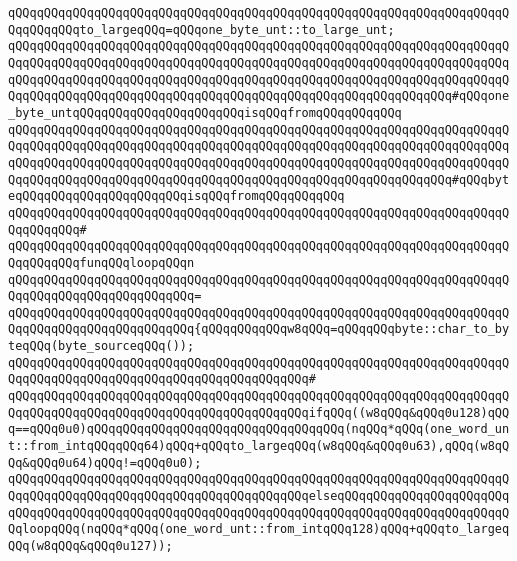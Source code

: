 \newline
\verb|qQQqqQQqqQQqqQQqqQQqqQQqqQQqqQQqqQQqqQQqqQQqqQQqqQQqqQQqqQQqqQQqqQQqqQQqqQQqqQQqto_largeqQQq=qQQqone_byte_unt::to_large_unt;|\newline
\newline
\verb|qQQqqQQqqQQqqQQqqQQqqQQqqQQqqQQqqQQqqQQqqQQqqQQqqQQqqQQqqQQqqQQqqQQqqQQqqQQqqQQqqQQqqQQqqQQqqQQqqQQqqQQqqQQqqQQqqQQqqQQqqQQqqQQqqQQqqQQqqQQqqQQqqQQqqQQqqQQqqQQqqQQqqQQqqQQqqQQqqQQqqQQqqQQqqQQqqQQqqQQqqQQqqQQqqQQqqQQqqQQqqQQqqQQqqQQqqQQqqQQqqQQqqQQqqQQqqQQqqQQqqQQqqQQqqQQq#qQQqone_byte_untqQQqqQQqqQQqqQQqqQQqqQQqisqQQqfromqQQqqQQqqQQq|\newline
\verb|qQQqqQQqqQQqqQQqqQQqqQQqqQQqqQQqqQQqqQQqqQQqqQQqqQQqqQQqqQQqqQQqqQQqqQQqqQQqqQQqqQQqqQQqqQQqqQQqqQQqqQQqqQQqqQQqqQQqqQQqqQQqqQQqqQQqqQQqqQQqqQQqqQQqqQQqqQQqqQQqqQQqqQQqqQQqqQQqqQQqqQQqqQQqqQQqqQQqqQQqqQQqqQQqqQQqqQQqqQQqqQQqqQQqqQQqqQQqqQQqqQQqqQQqqQQqqQQqqQQqqQQqqQQqqQQq#qQQqbyteqQQqqQQqqQQqqQQqqQQqqQQqisqQQqfromqQQqqQQqqQQq|\newline
\verb|qQQqqQQqqQQqqQQqqQQqqQQqqQQqqQQqqQQqqQQqqQQqqQQqqQQqqQQqqQQqqQQqqQQqqQQqqQQqqQQq#|\newline
\verb|qQQqqQQqqQQqqQQqqQQqqQQqqQQqqQQqqQQqqQQqqQQqqQQqqQQqqQQqqQQqqQQqqQQqqQQqqQQqqQQqfunqQQqloopqQQqn|\newline
\verb|qQQqqQQqqQQqqQQqqQQqqQQqqQQqqQQqqQQqqQQqqQQqqQQqqQQqqQQqqQQqqQQqqQQqqQQqqQQqqQQqqQQqqQQqqQQqqQQq=|\newline
\verb|qQQqqQQqqQQqqQQqqQQqqQQqqQQqqQQqqQQqqQQqqQQqqQQqqQQqqQQqqQQqqQQqqQQqqQQqqQQqqQQqqQQqqQQqqQQqqQQq{qQQqqQQqqQQqw8qQQq=qQQqqQQqbyte::char_to_byteqQQq(byte_sourceqQQq());|\newline
\verb|qQQqqQQqqQQqqQQqqQQqqQQqqQQqqQQqqQQqqQQqqQQqqQQqqQQqqQQqqQQqqQQqqQQqqQQqqQQqqQQqqQQqqQQqqQQqqQQqqQQqqQQqqQQqqQQq#|\newline
\verb|qQQqqQQqqQQqqQQqqQQqqQQqqQQqqQQqqQQqqQQqqQQqqQQqqQQqqQQqqQQqqQQqqQQqqQQqqQQqqQQqqQQqqQQqqQQqqQQqqQQqqQQqqQQqqQQqifqQQq((w8qQQq&qQQq0u128)qQQq==qQQq0u0)qQQqqQQqqQQqqQQqqQQqqQQqqQQqqQQqqQQq(nqQQq*qQQq(one_word_unt::from_intqQQqqQQq64)qQQq+qQQqto_largeqQQq(w8qQQq&qQQq0u63),qQQq(w8qQQq&qQQq0u64)qQQq!=qQQq0u0);|\newline
\verb|qQQqqQQqqQQqqQQqqQQqqQQqqQQqqQQqqQQqqQQqqQQqqQQqqQQqqQQqqQQqqQQqqQQqqQQqqQQqqQQqqQQqqQQqqQQqqQQqqQQqqQQqqQQqqQQqelseqQQqqQQqqQQqqQQqqQQqqQQqqQQqqQQqqQQqqQQqqQQqqQQqqQQqqQQqqQQqqQQqqQQqqQQqqQQqqQQqqQQqqQQqqQQqqQQqloopqQQq(nqQQq*qQQq(one_word_unt::from_intqQQq128)qQQq+qQQqto_largeqQQq(w8qQQq&qQQq0u127));|\newline

